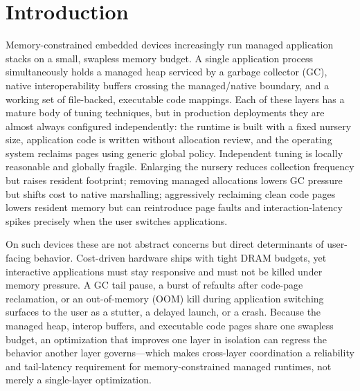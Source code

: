 \ifmeasurementready\else
\begin{center}
\end{center}
\fi

\section{Introduction}
\label{sec:intro}

Memory-constrained embedded devices increasingly run managed
application stacks on a small, swapless memory budget. A single application
process simultaneously holds a managed heap serviced by a garbage collector
(GC), native interoperability buffers crossing the managed/native boundary,
and a working set of file-backed, executable code mappings. Each of these
layers has a mature body of tuning techniques, but in production deployments
they are almost always configured independently: the runtime is built with
a fixed nursery size, application code is written without allocation
review, and the operating system reclaims pages using generic global
policy. Independent tuning is locally reasonable and globally fragile.
Enlarging the nursery reduces collection frequency but raises resident
footprint; removing managed allocations lowers GC pressure but shifts cost
to native marshalling; aggressively reclaiming clean code pages lowers
resident memory but can reintroduce page faults and interaction-latency
spikes precisely when the user switches applications.

On such devices these are not abstract concerns but direct determinants of
user-facing behavior. Cost-driven hardware ships with tight DRAM budgets, yet
interactive applications must stay responsive and must not be killed under
memory pressure. A GC tail pause, a burst of refaults after code-page
reclamation, or an out-of-memory (OOM) kill during application switching
surfaces to the user as a stutter, a delayed launch, or a crash. Because the
managed heap, interop buffers, and executable code pages share one swapless
budget, an optimization that improves one layer in isolation can regress the
behavior another layer governs---which makes cross-layer coordination a
reliability and tail-latency requirement for memory-constrained managed
runtimes, not merely a single-layer optimization.

